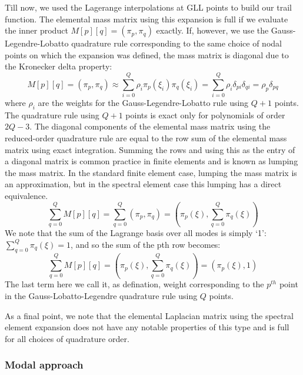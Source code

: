 \documentclass[
]{scrartcl}
\begin{document}
Till now, we used the Lagerange interpolations at GLL points to build
our trail function. The elemental mass matrix using this expansion is
full if we evaluate the inner product \(M[p][q] = (\pi_p,\pi_q)\)
exactly. If, however, we use the Gauss-Legendre-Lobatto quadrature rule
corresponding to the same choice of nodal points on which the expansion
was defined, the mass matrix is diagonal due to the Kronecker delta
property: \begin{equation}
M[p][q] = (\pi_p,\pi_q) \approx\sum_{i=0}^{Q}\rho_i\pi_p(\xi_i)\pi_q(\xi_i) = \sum_{i=0}^{Q}\rho_i\delta_{pi}\delta_{qi} = \rho_p\delta_{pq}
\end{equation} where \(\rho_i\) are the weights for the
Gauss-Legendre-Lobatto rule using \(Q+1\) points. The quadrature rule
using \(Q + 1\) points is exact only for polynomials of order \(2Q-3\).
The diagonal components of the elemental mass matrix using the
reduced-order quadrature rule are equal to the row sum of the elemental
mass matrix using exact integration. Summing the rows and using this as
the entry of a diagonal matrix is common practice in finite elements and
is known as lumping the mass matrix. In the standard finite element
case, lumping the mass matrix is an approximation, but in the spectral
element case this lumping has a direct equivalence. \begin{equation}
\sum_{q=0}^Q M[p][q] = \sum_{q=0}^Q(\pi_p,\pi_q) =(\pi_p(\xi),\sum_{q=0}^Q\pi_q(\xi))
\end{equation} We note that the sum of the Lagrange basis over all modes
is simply `1': \(\sum_{q=0}^Q\pi_q(\xi)=1\), and so the sum of the pth
row becomes: \begin{equation}
\sum_{q=0}^Q M[p][q]  =(\pi_p(\xi),\sum_{q=0}^Q\pi_q(\xi))= (\pi_p(\xi),1)
\end{equation} The last term here we call it, as defination, weight
corresponding to the \(p^{th}\) point in the Gauss-Lobatto-Legendre
quadrature rule using \(Q\) points.

As a final point, we note that the elemental Laplacian matrix using the
spectral element expansion does not have any notable properties of this
type and is full for all choices of quadrature order.

\hypertarget{modal-approach}{%
\subsubsection{Modal approach}\label{modal-approach}}
\end{document}
